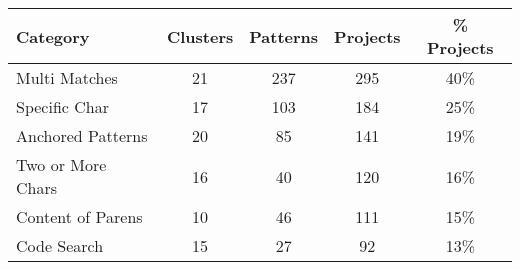 \begin{adjustbox}{width=0.95\textwidth}
\begin{tabular}{p{1.25in}cccc}
\toprule
\textbf{Category} & \textbf{Clusters} & \textbf{Patterns} & \textbf{Projects} & \textbf{\% Projects} \\  \midrule
Multi Matches & 21 & 237 & 295 & 40\% \\
\midrule
Specific Char & 17 & 103 & 184 & 25\% \\
\midrule
Anchored Patterns & 20 & 85 & 141 & 19\% \\
\midrule
Two or More Chars & 16 & 40 & 120 & 16\% \\
\midrule
Content of Parens & 10 & 46 & 111 & 15\% \\
\midrule
Code Search & 15 & 27 & 92 & 13\% \\
\bottomrule
\end{tabular}
\end{adjustbox}

